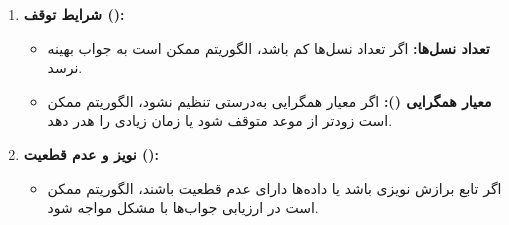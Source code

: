 \documentclass[12pt]{exam}
\begin{document}
\begin{questions}
\begin{parts}
\begin{enumerate}
	
	\item \textbf{شرایط توقف ():}
	
	\begin{itemize}
		\item \textbf{تعداد نسل‌ها: }
		اگر تعداد نسل‌ها کم باشد، الگوریتم ممکن است به جواب بهینه نرسد.
		
		\item \textbf{معیار همگرایی (): }
		اگر معیار همگرایی به‌درستی تنظیم نشود، الگوریتم ممکن است زودتر از موعد متوقف شود یا زمان زیادی را هدر دهد.
	\end{itemize}
	
	\item \textbf{نویز و عدم قطعیت ():}
	
	\begin{itemize}
		\item اگر تابع برازش نویزی باشد یا داده‌ها دارای عدم قطعیت باشند، الگوریتم ممکن است در ارزیابی جواب‌ها با مشکل مواجه شود.
	\end{itemize}
	 \end{enumerate}
	 
	 \end{parts}

\end{questions}

				
	
	\newpage
\end{document}
